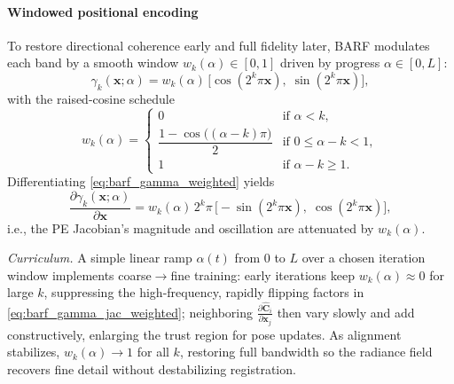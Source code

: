 \begin{enrichment}
\begin{enrichment}
        \paragraph{Windowed positional encoding}
        To restore directional coherence early and full fidelity later, BARF modulates each band by a smooth window $w_k(\alpha)\in[0,1]$ driven by progress $\alpha\in[0,L]$:
        \begin{equation}
            \gamma_k(\mathbf{x};\alpha)
            =
            w_k(\alpha)\,\big[\cos(2^k\pi\mathbf{x}),\;\sin(2^k\pi\mathbf{x})\big],
            \label{eq:barf_gamma_weighted}
        \end{equation}
        with the raised-cosine schedule
        \begin{equation}
            w_k(\alpha)=
            \begin{cases}
                0 & \text{if } \alpha<k,\\[6pt]
                \dfrac{1-\cos\!\big((\alpha-k)\pi\big)}{2} & \text{if } 0\le \alpha-k<1,\\[10pt]
                1 & \text{if } \alpha-k\ge 1.
            \end{cases}
            \label{eq:barf_wk_exact}
        \end{equation}
        Differentiating \eqref{eq:barf_gamma_weighted} yields
        \begin{equation}
            \frac{\partial \gamma_k(\mathbf{x};\alpha)}{\partial \mathbf{x}}
            =
            w_k(\alpha)\,2^k\pi\,\big[-\sin(2^k\pi\mathbf{x}),\;\cos(2^k\pi\mathbf{x})\big],
            \label{eq:barf_gamma_jac_weighted}
        \end{equation}
        i.e., the PE Jacobian’s magnitude and oscillation are attenuated by $w_k(\alpha)$.
        
        \medskip
        \noindent\textit{Curriculum.}
        A simple linear ramp $\alpha(t)$ from $0$ to $L$ over a chosen iteration window implements coarse$\!\rightarrow\!$fine training:
        early iterations keep $w_k(\alpha)\!\approx\!0$ for large $k$, suppressing the high-frequency, rapidly flipping factors in
        \eqref{eq:barf_gamma_jac_weighted}; neighboring $\frac{\partial \widehat{\mathbf{C}}_i}{\partial \mathbf{x}_j}$ then vary slowly and add constructively, enlarging the trust region for pose updates.
        As alignment stabilizes, $w_k(\alpha)\!\to\!1$ for all $k$, restoring full bandwidth so the radiance field recovers fine detail without destabilizing registration.
        

\end{enrichment}
\end{enrichment}
